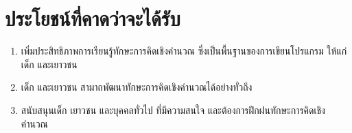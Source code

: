 \section{ประโยชน์ที่คาดว่าจะได้รับ}
\begin{enumerate}
    \item เพิ่มประสิทธิภาพการเรียนรู้ทักษะการคิดเชิงคำนวณ ซึ่งเป็นพื้นฐานของการเขียนโปรแกรม ให้แก่เด็ก และเยาวชน
    \item เด็ก และเยาวชน สามาถพัฒนาทักษะการคิดเชิงคำนวณได้อย่างทั่วถึง
    \item สนับสนุนเด็ก เยาวชน และบุคคลทั่วไป ที่มีความสนใจ และต้องการฝึกฝนทักษะการคิดเชิงคำนวณ
    
\end{enumerate}